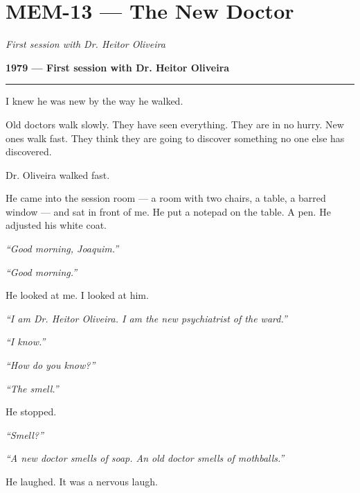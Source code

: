 \section*{\textbf{MEM-13} --- The New Doctor}

\noindent \textit{First session with Dr. Heitor Oliveira}

\noindent \textbf{1979 --- First session with Dr. Heitor Oliveira}

\vspace{0.5em}\noindent\rule{\textwidth}{0.5pt}\vspace{0.5em}

\noindent I knew he was new by the way he walked.

\noindent Old doctors walk slowly. They have seen everything. They are in no hurry. New ones walk fast. They think they are going to discover something no one else has discovered.

\noindent Dr. Oliveira walked fast.

\noindent He came into the session room --- a room with two chairs, a table, a barred window --- and sat in front of me. He put a notepad on the table. A pen. He adjusted his white coat.

\noindent \textit{\textquotedblleft{}Good morning, Joaquim.\textquotedblright{}}

\noindent \textit{\textquotedblleft{}Good morning.\textquotedblright{}}

\noindent He looked at me. I looked at him.

\noindent \textit{\textquotedblleft{}I am Dr. Heitor Oliveira. I am the new psychiatrist of the ward.\textquotedblright{}}

\noindent \textit{\textquotedblleft{}I know.\textquotedblright{}}

\noindent \textit{\textquotedblleft{}How do you know?\textquotedblright{}}

\noindent \textit{\textquotedblleft{}The smell.\textquotedblright{}}

\noindent He stopped.

\noindent \textit{\textquotedblleft{}Smell?\textquotedblright{}}

\noindent \textit{\textquotedblleft{}A new doctor smells of soap. An old doctor smells of mothballs.\textquotedblright{}}

\noindent He laughed. It was a nervous laugh.

